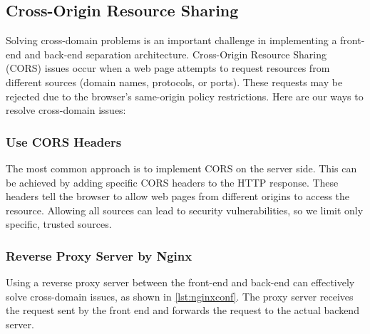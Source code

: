\documentclass[journal]{IEEEtran}
\begin{document}
\subsection{Cross-Origin Resource Sharing}
Solving cross-domain problems is an important challenge in implementing a front-end and back-end separation architecture. Cross-Origin Resource Sharing (CORS) issues occur when a web page attempts to request resources from different sources (domain names, protocols, or ports). These requests may be rejected due to the browser's same-origin policy restrictions. Here are our ways to resolve cross-domain issues:

\subsubsection{Use CORS Headers}
The most common approach is to implement CORS on the server side. This can be achieved by adding specific CORS headers to the HTTP response. These headers tell the browser to allow web pages from different origins to access the resource. Allowing all sources can lead to security vulnerabilities, so we limit only specific, trusted sources.

\subsubsection{Reverse Proxy Server by Nginx}
Using a reverse proxy server between the front-end and back-end can effectively solve cross-domain issues, as shown in \ref{lst:nginxconf}. The proxy server receives the request sent by the front end and forwards the request to the actual backend server.
\end{document}
